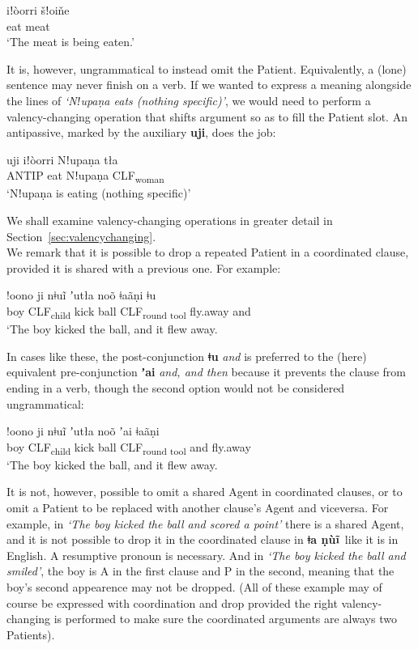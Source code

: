 \documentclass[11pt]{book}
\newcommand{\qcn}[1]{\textbf{#1}}
\newcommand{\langname}{\qcn{ǂa ṇùĩ}~}
\newcommand{\transl}[2]{\qcn{#1} \emph{#2}}
\newcommand{\grammsc}[1]{\textsc{#1}}
\newcommand{\CLF}[1]{\grammsc{CLF}\textsubscript{#1}}
\begin{document}
\begin{exe}
	\ex
	\gll iǃòorri 	šǃoiňe\\
eat 	meat\\
\glt `The meat is being eaten.'
\end{exe}

It is, however, ungrammatical to instead omit the Patient. Equivalently, a (lone) sentence may never finish on a verb. If we wanted to express a meaning alongside the lines of \emph{`Nǃupaṇa eats (nothing specific)'}, we would need to perform a valency-changing operation that shifts argument so as to fill the Patient slot. An antipassive, marked by the auxiliary \qcn{uji}, does the job:

\begin{exe}
	\ex
	\gll  uji 	iǃòorri Nǃupaṇa 	tła  \\
	ANTIP eat	Nǃupaṇa 	\CLF{woman} 	\\
	\glt `Nǃupaṇa is eating (nothing specific)'
\end{exe}

We shall examine valency-changing operations in greater detail in Section~\ref{sec:valencychanging}.\\

We remark that it is possible to drop a repeated Patient in a coordinated clause, provided it is shared with a previous one. For example:

\begin{exe}
\ex
\gll !oono 	ji 	nǂuĩ 	 	ʼutła 	noõ  ǂaãṇi ǂu\\
boy 	\CLF{child} 	kick 	ball 	\CLF{round tool} 	fly.away  and\\
\glt `The boy kicked the ball, and it flew away.
\end{exe}

In cases like these, the post-conjunction \transl{ǂu}{and} is preferred to the (here) equivalent pre-conjunction \transl{ʼai}{and, and then} because it prevents the clause from ending in a verb, though the second option would not be considered ungrammatical:

\begin{exe}
\ex
\gll !oono 	ji 	nǂuĩ 	 	ʼutła 	noõ  ʼai ǂaãṇi \\
boy 	\CLF{child} 	kick 	ball 	\CLF{round tool}   and	fly.away  \\
\glt `The boy kicked the ball, and it flew away.
\end{exe}

It is not, however, possible to omit a shared Agent in coordinated clauses, or to omit a Patient to be replaced with another clause's Agent and viceversa. For example, in \emph{`The boy kicked the ball and scored a point'} there is a shared Agent, and it is not possible to drop it in the coordinated clause in \langname like it is in English. A resumptive pronoun is necessary. And in \emph{`The boy kicked the ball and smiled'}, the boy is A in the first clause and P in the second, meaning that the boy's second appearence may not be dropped. (All of these example may of course be expressed with coordination and drop provided the right valency-changing is performed to make sure the coordinated arguments are always two Patients).
\end{document}
